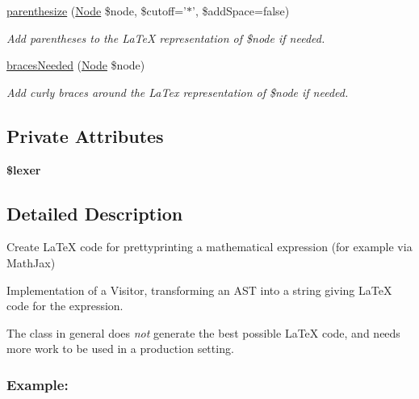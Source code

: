 \begin{DoxyCompactItemize}
\hyperlink{classMathParser_1_1Interpreting_1_1LaTeXPrinter_a0155571b5b4fea8a6b762beabdb02ccf}{parenthesize} (\hyperlink{classMathParser_1_1Parsing_1_1Nodes_1_1Node}{Node} \$node, \$cutoff='$\ast$', \$add\-Space=false)
\begin{DoxyCompactList}\small\item\em Add parentheses to the La\-Te\-X representation of \$node if needed. \end{DoxyCompactList}\item 
\hyperlink{classMathParser_1_1Interpreting_1_1LaTeXPrinter_a0f7cfa301dbab484b82a4aa83e9a37f1}{braces\-Needed} (\hyperlink{classMathParser_1_1Parsing_1_1Nodes_1_1Node}{Node} \$node)
\begin{DoxyCompactList}\small\item\em Add curly braces around the La\-Tex representation of \$node if needed. \end{DoxyCompactList}\end{DoxyCompactItemize}
\subsection*{Private Attributes}
\begin{DoxyCompactItemize}
\item 
\hypertarget{classMathParser_1_1Interpreting_1_1LaTeXPrinter_ad3c7631e73a252a1920dab0825b0be30}{{\bfseries \$lexer}}\label{classMathParser_1_1Interpreting_1_1LaTeXPrinter_ad3c7631e73a252a1920dab0825b0be30}

\end{DoxyCompactItemize}


\subsection{Detailed Description}
Create La\-Te\-X code for prettyprinting a mathematical expression (for example via Math\-Jax) 

Implementation of a Visitor, transforming an A\-S\-T into a string giving La\-Te\-X code for the expression.

The class in general does {\itshape not} generate the best possible La\-Te\-X code, and needs more work to be used in a production setting.

\subsubsection*{Example\-:}




